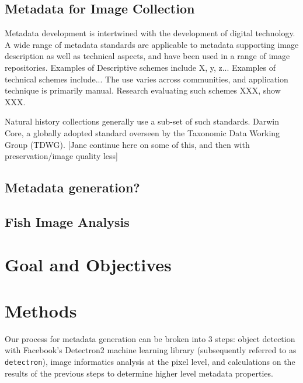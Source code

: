 \documentclass[screen,review]{acmart}
\begin{document}
\subsection{Metadata for Image Collection}
Metadata development is intertwined with the development of digital technology. A wide range of metadata standards are applicable to metadata supporting image description as well as technical aspects, and have been used in a range of image repositories. Examples of Descriptive schemes include X, y, z... Examples of technical schemes include... The use varies across communities, and application technique is primarily manual. Research evaluating such schemes XXX, show XXX. 

Natural history collections generally use a sub-set of such standards. Darwin Core, a globally adopted standard overseen by the Taxonomic Data Working Group (TDWG).  [Jane continue here on some of this, and then with preservation/image quality less]

\subsection{Metadata generation?}

\subsection{Fish Image Analysis}

\cite{BockAlexander2018TITE}
\cite{KonovalovD2017RDfA}
\cite{Williams:2020:UIF}

\section{Goal and Objectives}

\section{Methods}
Our process for metadata generation can be broken into 3 steps: object detection with Facebook's Detectron2 machine learning library (subsequently referred to as \verb|detectron|), image informatics analysis at the pixel level, and calculations on the results of the previous steps to determine higher level metadata properties.
\end{document}
